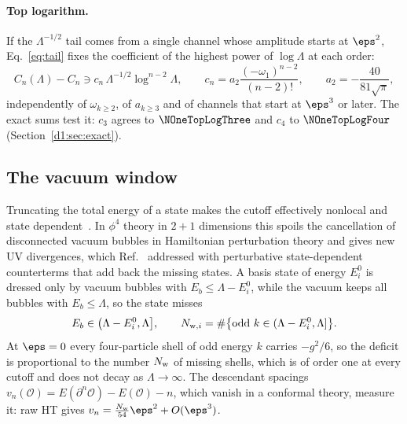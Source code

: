 \paragraph{Top logarithm.} If the $\Lambda^{-1/2}$ tail comes from a single channel whose amplitude starts at $\eps^2$,
Eq.~\eqref{eq:tail} fixes the coefficient of the highest power of $\log\Lambda$ at each order:
\begin{equation}
 C_n(\Lambda)-C_n\ni c_n\,\Lambda^{-1/2}\log^{n-2}\Lambda,\qquad
 c_n=a_2\frac{(-\omega_1)^{n-2}}{(n-2)!},\qquad a_2=-\frac{40}{81\sqrt\pi},
 \label{eq:toplog}
\end{equation}
independently of $\omega_{k\ge2}$, of $a_{k\ge3}$ and of channels that start at $\eps^3$ or later. The exact sums test it:
$c_3$ agrees to $\NOneTopLogThree$ and $c_4$ to $\NOneTopLogFour$ (Section~\ref{d1:sec:exact}).

\subsection{The vacuum window}\label{sec:window}
Truncating the total energy of a state makes the cutoff effectively nonlocal and state dependent~\cite{Rychkov:2014eea}.
In $\phi^4$ theory in $2+1$ dimensions this spoils the cancellation of disconnected vacuum bubbles in Hamiltonian
perturbation theory and gives new UV divergences, which Ref.~\cite{Elias-Miro:2020qwz} addressed with perturbative
state-dependent counterterms that add back the missing states.
A basis state of energy $E^0_i$ is dressed only by vacuum bubbles with $E_b\le\Lambda-E^0_i$, while the vacuum keeps all
bubbles with $E_b\le\Lambda$, so the state misses
\begin{equation}
 E_b\in\big(\Lambda-E^0_i,\Lambda\big],\qquad N_{{\rm w},i}=\#\big\{\text{odd }k\in(\Lambda-E^0_i,\Lambda]\big\}.
 \label{eq:window}
\end{equation}
At $\eps=0$ every four-particle shell of odd energy $k$ carries $-g^2/6$, so the deficit is proportional to the number
$N_{\rm w}$ of missing shells, which is of order one at every cutoff and does not decay as $\Lambda\to\infty$. The
descendant spacings $v_n(\mathcal O)=E(\partial^n\mathcal O)-E(\mathcal O)-n$, which vanish in a conformal theory,
measure it: raw HT gives $v_n=\tfrac{N_{\rm w}}{54}\eps^2+O(\eps^3)$.


